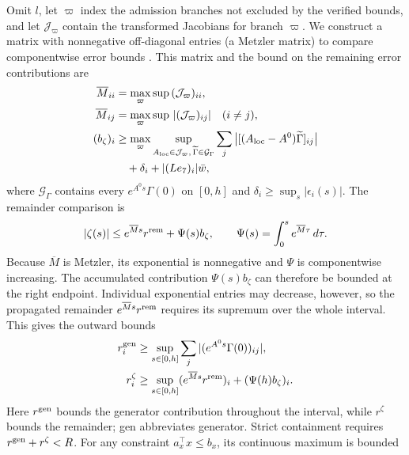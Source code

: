 \documentclass[final]{cas-sc}
\theoremstyle{definition}
\theoremstyle{plain}
\theoremstyle{definition}
\theoremstyle{plain}
\begin{document}
Omit $l$, let $\varpi$ index the admission branches not excluded by the
verified bounds, and let $\mathcal J_\varpi$ contain the transformed
Jacobians for branch $\varpi$. We construct a matrix with nonnegative
off-diagonal entries (a Metzler matrix) to compare componentwise error
bounds \cite{farina2000positive}. This matrix and the bound on the
remaining error contributions are
\begin{equation}
\begin{aligned}
\overline M_{ii}&=\max_\varpi\sup\,(\mathcal J_\varpi)_{ii},\\
\overline M_{ij}&=\max_\varpi\sup\,|(\mathcal J_\varpi)_{ij}|
\quad(i\ne j),\\
(b_\zeta)_i&\ge\max_\varpi
\sup_{A_{\rm loc}\in\mathcal J_\varpi,\,\widetilde\Gamma\in\mathcal G_\Gamma}
\sum_j\big|[(A_{\rm loc}-A^0)\widetilde\Gamma]_{ij}\big|\\
&\quad+\delta_i+|(Le_7)_i|\bar w,
\end{aligned}
\label{eq:structure-metzler}
\end{equation}
where $\mathcal G_\Gamma$ contains every $e^{A^0s}\Gamma(0)$ on
$[0,h]$ and $\delta_i\ge\sup_s|\epsilon_i(s)|$. The remainder
comparison is
\begin{equation}
|\zeta(s)|\le e^{\overline Ms}r^{\rm rem}+\Psi(s)b_\zeta,\qquad
\Psi(s)=\int_0^se^{\overline M\tau}\,d\tau .
\label{eq:structure-remainder-bound}
\end{equation}
Because $\overline M$ is Metzler, its exponential is nonnegative and
$\Psi$ is componentwise increasing. The accumulated contribution
$\Psi(s)b_\zeta$ can therefore be bounded at the right endpoint.
Individual exponential entries may decrease, however, so the
propagated remainder $e^{\overline Ms}r^{\rm rem}$ requires its
supremum over the whole interval.
This gives the outward bounds
\begin{equation}
\begin{aligned}
r_i^{\rm gen}&\ge\sup_{s\in[0,h]}\sum_j|(e^{A^0s}\Gamma(0))_{ij}|,\\
r_i^{\zeta}&\ge\sup_{s\in[0,h]}(e^{\overline Ms}r^{\rm rem})_i
+(\Psi(h)b_\zeta)_i .
\end{aligned}
\label{eq:structure-continuous-radii}
\end{equation}
Here $r^{\rm gen}$ bounds the generator contribution throughout the
interval, while $r^{\zeta}$ bounds the remainder; gen abbreviates
generator. Strict containment requires $r^{\rm gen}+r^{\zeta}<R$. For
any constraint $a_x^\top x\le b_x$, its continuous maximum is bounded
\end{document}
